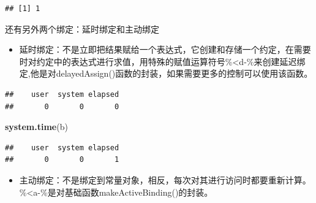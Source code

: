 \documentclass[]{book}
\newenvironment{Shaded}{\begin{snugshade}}{\end{snugshade}}
\newcommand{\KeywordTok}[1]{\textcolor[rgb]{0.13,0.29,0.53}{\textbf{#1}}}
\newcommand{\DecValTok}[1]{\textcolor[rgb]{0.00,0.00,0.81}{#1}}
\newcommand{\StringTok}[1]{\textcolor[rgb]{0.31,0.60,0.02}{#1}}
\newcommand{\OperatorTok}[1]{\textcolor[rgb]{0.81,0.36,0.00}{\textbf{#1}}}
\newcommand{\NormalTok}[1]{#1}
\providecommand{\tightlist}{%
  \setlength{\itemsep}{0pt}\setlength{\parskip}{0pt}}
\begin{document}
\begin{verbatim}
## [1] 1
\end{verbatim}

还有另外两个绑定：延时绑定和主动绑定

\begin{itemize}
\tightlist
\item
  延时绑定：不是立即把结果赋给一个表达式，它创建和存储一个约定，在需要时对约定中的表达式进行求值，用特殊的赋值运算符号\%\textless{}d-\%来创建延迟绑定,他是对delayedAssign()函数的封装，如果需要更多的控制可以使用该函数。
\end{itemize}

\begin{Shaded}
\end{Shaded}

\begin{verbatim}
##    user  system elapsed 
##       0       0       0
\end{verbatim}

\begin{Shaded}
\begin{Highlighting}[]
\KeywordTok{system.time}\NormalTok{(b)}
\end{Highlighting}
\end{Shaded}

\begin{verbatim}
##    user  system elapsed 
##       0       0       1
\end{verbatim}

\begin{itemize}
\tightlist
\item
  主动绑定：不是绑定到常量对象，相反，每次对其进行访问时都要重新计算。\%\textless{}a-\%是对基础函数makeActiveBinding()的封装。
\end{itemize}

\begin{Shaded}
\end{Shaded}
\end{document}
